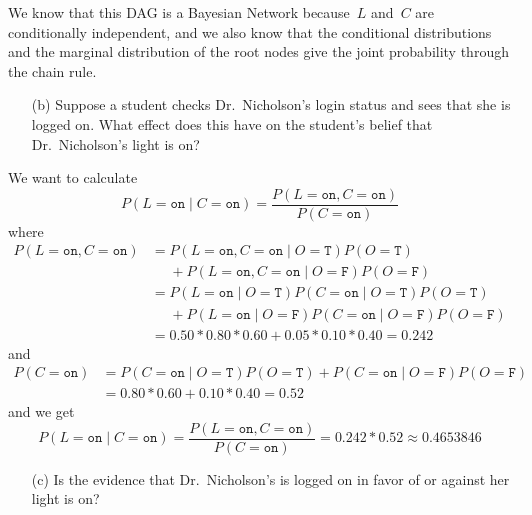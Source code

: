 \documentclass[a4paper]{article}
\newcommand{\T}{\texttt{T}}
\newcommand{\F}{\texttt{F}}
\newcommand{\on}{\texttt{on}}
\begin{document}
We know that this DAG is a Bayesian Network because~\(L\) and~\(C\) are
conditionally independent, and we also know that the conditional distributions
and the marginal distribution of the root nodes give the joint probability
through the chain rule.

\begin{enumerate}
    \item[(b)] Suppose a student checks Dr.\ Nicholson's login status and sees
        that she is logged on. What effect does this have on the student's
        belief that Dr.\ Nicholson's light is on?
\end{enumerate}

We want to calculate
\[
    P(L = \on \mid C = \on) = \frac{P(L = \on, C = \on)}{P(C = \on)}
\]
where
\begin{align*}
    P(L = \on, C = \on) &= P(L = \on, C = \on \mid O = \T)P(O = \T) \\
                        &\phantom{=}+ P(L = \on, C = \on \mid O = \F)P(O = \F) \\
                        &= P(L = \on \mid O = \T)P(C = \on \mid O = \T)P(O = \T) \\
                        &\phantom{=}+ P(L = \on \mid O = \F)P(C = \on \mid O = \F)P(O = \F) \\
                        &= 0.50 * 0.80 * 0.60 + 0.05 * 0.10 * 0.40 = 0.242
\end{align*}
and
\begin{align*}
    P(C = \on) &= P(C = \on \mid O = \T)P(O = \T) + P(C = \on \mid O = \F)P(O = \F) \\
               &= 0.80 * 0.60 + 0.10 * 0.40 = 0.52
\end{align*}
and we get
\[
    P(L = \on \mid C = \on) = \frac{P(L = \on, C = \on)}{P(C = \on)} = 0.242 * 0.52 \approx 0.4653846
\]

\begin{enumerate}
    \item[(c)] Is the evidence that Dr.\ Nicholson's is logged on in favor of or
        against her light is on?
\end{enumerate}
\end{document}
